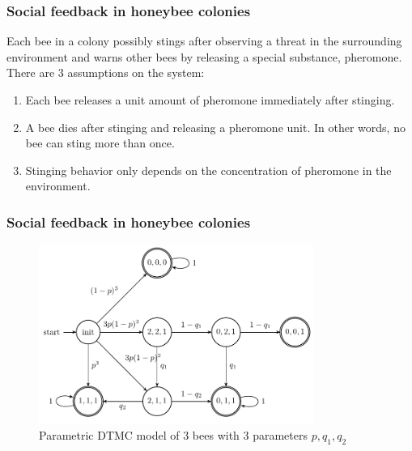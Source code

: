 \documentclass{beamer}
\begin{document}
\begin{frame}
    \frametitle{Social feedback in honeybee colonies}
    Each bee in a colony possibly stings after observing a threat in the surrounding environment and
    warns other bees by releasing a special substance, pheromone. There are 3 assumptions on the system:
    \begin{enumerate}
        \item Each bee releases a unit amount of pheromone immediately after stinging.
        \item A bee dies after stinging and releasing a pheromone unit. In other words, no bee can sting
              more than once.
        \item Stinging behavior only depends on the concentration of pheromone in the environment.
    \end{enumerate}
\end{frame}

\begin{frame}
    \frametitle{Social feedback in honeybee colonies}
    \begin{figure}[H]
        \centering
        \includegraphics[width=0.8\textwidth]{figures/bees-dtmc.png}
        \caption{Parametric DTMC model of 3 bees with 3 parameters $p, q_1, q_2$}
        \label{fig:bees3}
    \end{figure}
\end{frame}
\end{document}
